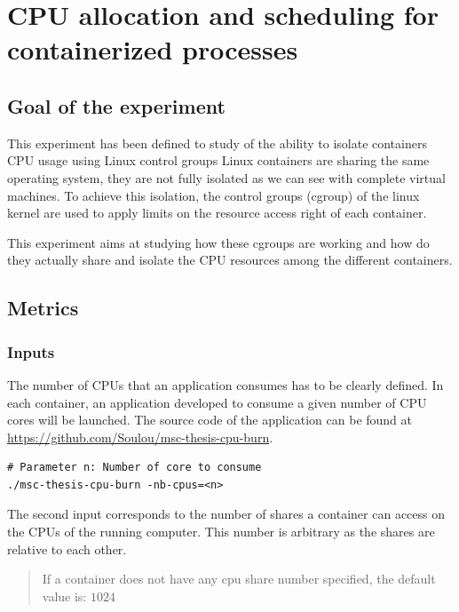 \chapter{CPU allocation and scheduling for containerized processes}
\label{cpuallocation}

\section{Goal of the experiment}

This experiment has been defined to study of the ability to isolate containers
CPU usage using Linux control groups Linux containers are sharing the same
operating system, they are not fully isolated as we can see with complete
virtual machines. To achieve this isolation, the control groups (cgroup) of the
linux kernel are used to apply limits on the resource access right of each
container.

This experiment aims at studying how these cgroups are working and how do they
actually share and isolate the CPU resources among the different containers.

\section{Metrics}

\subsection{Inputs}

The number of CPUs that an application consumes has to be clearly defined. In
each container, an application developed to consume a given number of CPU
cores will be launched. The source code of the application can be found at
\url{https://github.com/Soulou/msc-thesis-cpu-burn}.

\vspace{1em}
\lstset{language=bash}

\begin{lstlisting}
# Parameter n: Number of core to consume
./msc-thesis-cpu-burn -nb-cpus=<n>
\end{lstlisting}

The second input corresponds to the number of shares a container can access
on the CPUs of the running computer. This number is arbitrary as the shares
are relative to each other. 

\begin{quote}
If a container does not have any cpu share number specified, the default value
is: $1024$
\end{quote}

